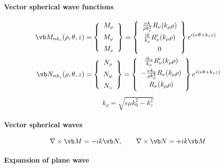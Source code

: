 \documentclass[letterpaper]{article}
\begin{document}
\paragraph{Vector spherical wave functions}
\begin{align*}
 \vb M_{nk_z}(\rho,\theta,z)
 &=\left\{ \begin{array}{c} M_\rho \\[5pt] M_\varphi \\[5pt] M_z 
             \end{array}
   \right\}
  =\left\{ \begin{array}{c}
           \frac{\nu k}{\rho k_\rho^2} R_\nu(k_\rho \rho) \\[5pt]
           \frac{i k}{k_\rho} R^\prime_\nu(k_\rho \rho)   \\[5pt]
           0
           \end{array}
  \right\} e^{i(\nu\theta + k_z z)}
\\
 \vb N_{nk_z}(\rho,\theta,z)
 &=\left\{ \begin{array}{c} N_\rho \\[5pt] N_\varphi \\[5pt] N_z 
             \end{array}
   \right\}
  =\left\{ \begin{array}{c}
           \frac{i k_z}{k_\rho} R^\prime_\nu(k_\rho \rho)   \\[5pt]
          -\frac{\nu k_z}{\rho k_\rho^2} R_\nu(k_\rho \rho) \\[5pt]
           R_\nu(k_\rho \rho)                               \\[5pt]
           \end{array}
  \right\} e^{i(\nu\theta + k_z z)}
\end{align*}
$$ k_\rho = \sqrt{ \epsilon\mu k_0^2 - k_z^2 } $$

\paragraph{Vector spherical waves}
$$ \nabla \times \vb M = -ik\vb N, \qquad
   \nabla \times \vb N = +ik\vb M
$$

\paragraph{Expansion of plane wave}
\end{document}
